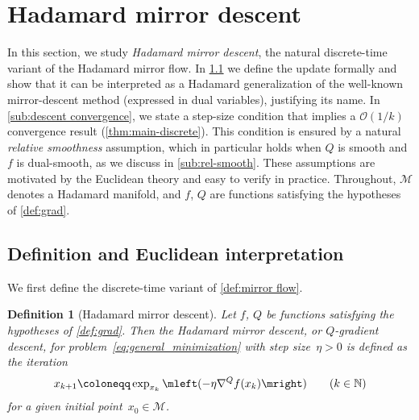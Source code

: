 \documentclass[11pt,letterpaper]{article}
\newtheorem{definition}[theorem]{Definition}\AddToHook{env/definition/begin}{\crefalias{theorem}{definition}}
\newtheorem{remark}[theorem]{Remark}\AddToHook{env/remark/begin}{\crefalias{theorem}{remark}}
\numberwithin{equation}{section}
\newcommand{\NN}{\mathbb{N}}
\newcommand{\MM}{\mathcal{M}}
\begin{document}

\section{Hadamard mirror descent}\label{sec:discrete-time}
In this section, we study \emph{Hadamard mirror descent}, the natural discrete-time variant of the Hadamard mirror flow.
In \cref{sub:descent and euclidean} we define the update formally and show that it can be interpreted as a Hadamard generalization of the well-known mirror-descent method (expressed in dual variables), justifying its name.
In \cref{sub:descent convergence}, we state a step-size condition that implies a $\mathcal{O}(1/k)$ convergence result (\cref{thm:main-discrete}).
This condition is ensured by a natural \emph{relative smoothness} assumption, which in particular holds when $Q$ is smooth and $f$ is dual-smooth, as we discuss in \cref{sub:rel-smooth}.
These assumptions are motivated by the Euclidean theory and easy to verify in practice.
Throughout, $\MM$ denotes a Hadamard manifold, and $f$, $Q$ are functions satisfying the hypotheses of \cref{def:grad}.

\subsection{Definition and Euclidean interpretation}\label{sub:descent and euclidean}

We first define the discrete-time variant of \cref{def:mirror flow}.

\begin{definition}[Hadamard mirror descent]
Let $f$, $Q$ be functions satisfying the hypotheses of \cref{def:grad}.
Then the \emph{Hadamard mirror descent}, or $Q$-gradient descent, for problem~\eqref{eq:general_minimization} with step size~$\eta>0$ is defined as the iteration
\begin{align}\label{eq:descent}
    x_{k+1} \coloneqq \exp_{x_k}\mleft( -\eta \nabla^Q f(x_k) \mright) \qquad (k \in \NN)
\end{align}
for a given initial point~$x_0 \in \MM$.
\end{definition}
\end{document}
